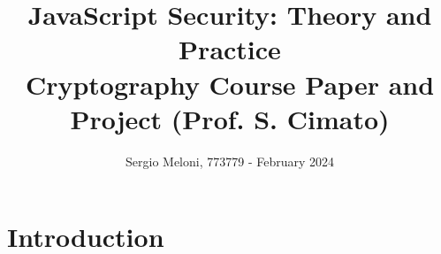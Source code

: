 \documentclass{article}
\title{%
  JavaScript Security: Theory and Practice \\
  \large Cryptography Course Paper and Project (Prof. S. Cimato)}
\author{Sergio Meloni, 773779 - February 2024}
\date{\vspace{-5ex}}
\begin{document}
\maketitle

{
 \hypersetup{linkcolor=black}
 \tableofcontents
}

\newpage
\maketitle
\section{Introduction}
\end{document}

